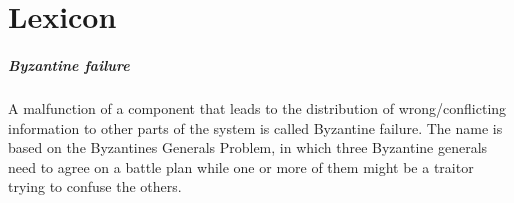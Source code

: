 
\cleardoublepage
\chapter{Lexicon}
\label{app:dic}

\paragraph*{Byzantine failure} A malfunction of a component that leads to the distribution of wrong/conflicting information to other parts of the system is called Byzantine failure. The name is based on the Byzantines Generals Problem, in which three Byzantine generals need to agree on a battle plan while one or more of them might be a traitor trying to confuse the others.
